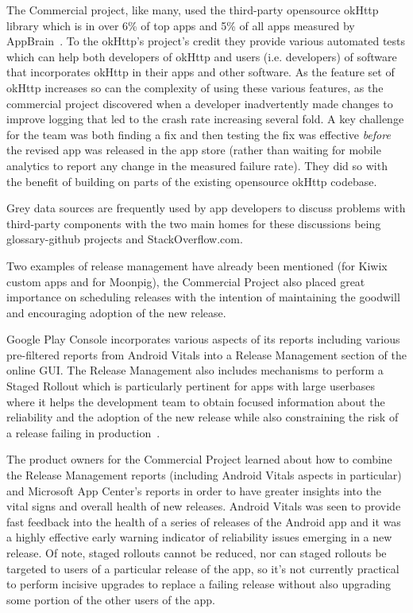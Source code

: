 The Commercial project, like many, used the third-party opensource okHttp library which is in over 6\% of top apps and 5\% of all apps measured by AppBrain~.
%
To the okHttp's project's credit they provide various automated tests which can help both developers of okHttp and users (i.e. developers) of software that incorporates okHttp in their apps and other software. As the feature set of okHttp increases so can the complexity of using these various features, as the commercial project discovered when a developer inadvertently made changes to improve logging that led to the crash rate increasing several fold. A key challenge for the team was both finding a fix and then testing the fix was effective \emph{before} the revised app was released in the app store (rather than waiting for mobile analytics to report any change in the measured failure rate). They did so with the benefit of building on parts of the existing opensource okHttp codebase.

Grey data sources are frequently used by app developers to discuss problems with third-party components with the two main homes for these discussions being \gls{glossary-github} projects and StackOverflow.com.


Two examples of release management have already been mentioned (for Kiwix custom apps and for Moonpig), the Commercial Project also placed great importance on scheduling releases with the intention of maintaining the goodwill and encouraging adoption of the new release. 

Google Play Console incorporates various aspects of its reports including various pre-filtered reports from Android Vitals into a Release Management section of the online GUI. The Release Management also includes mechanisms to perform a Staged Rollout which is particularly pertinent for apps with large userbases where it helps the development team to obtain focused information about the reliability and the adoption of the new release while also constraining the risk of a release failing in production~. 

The product owners for the Commercial Project learned about how to combine the Release Management reports (including Android Vitals aspects in particular) and Microsoft App Center's reports in order to have greater insights into the vital signs and overall health of new releases. Android Vitals was seen to provide fast feedback into the health of a series of releases of the Android app and it was a highly effective early warning indicator of reliability issues emerging in a new release. Of note, staged rollouts cannot be reduced, nor can staged rollouts be targeted to users of a particular release of the app, so it's not currently practical to perform incisive upgrades to replace a failing release without also upgrading some portion of the other users of the app.

